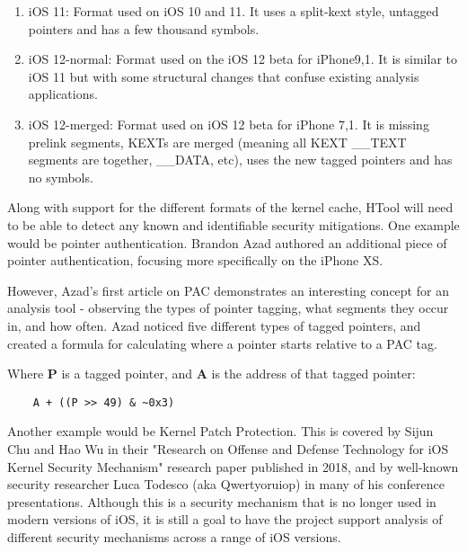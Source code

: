 \begin{enumerate}
	\item iOS 11: Format used on iOS 10 and 11. It uses a split-kext style, untagged pointers and has a few thousand symbols.
	\item iOS 12-normal: Format used on the iOS 12 beta for iPhone9,1. It is similar to iOS 11 but with some structural changes that confuse existing analysis applications.
	\item iOS 12-merged: Format used on iOS 12 beta for iPhone 7,1. It is missing prelink segments, KEXTs are merged (meaning all KEXT \_\_TEXT segments are together, \_\_DATA, etc), uses the new tagged pointers and has no symbols.
\end{enumerate}



Along with support for the different formats of the kernel cache, HTool will need to be able to detect any known and identifiable security mitigations. One example would be pointer authentication. Brandon Azad authored an additional piece of pointer authentication, focusing more specifically on the iPhone XS\cite{azad-pac-indepth}.

However, Azad's first article on PAC demonstrates an interesting concept for an analysis tool - observing the types of pointer tagging, what segments they occur in, and how often. Azad noticed five different types of tagged pointers, and created a formula for calculating where a pointer starts relative to a PAC tag. 
 
 Where \textbf{P} is a tagged pointer, and \textbf{A} is the address of that tagged pointer:
 
 \begin{verbatim}
 	A + ((P >> 49) & ~0x3)
 \end{verbatim}
 
  Another example would be Kernel Patch Protection. This is covered by Sijun Chu and Hao Wu in their "Research on Offense and Defense Technology for iOS Kernel Security Mechanism"\cite{sijun-kernel-paper} research paper published in 2018, and by well-known security researcher Luca Todesco (aka Qwertyoruiop) in many of his conference presentations. Although this is a security mechanism that is no longer used in modern versions of iOS, it is still a goal to have the project support analysis of different security mechanisms across a range of iOS versions.
 


